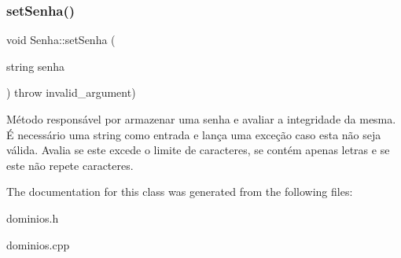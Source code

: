 \subsubsection{\texorpdfstring{set\+Senha()}{setSenha()}}
{\footnotesize\ttfamily void Senha\+::set\+Senha (\begin{DoxyParamCaption}\item[{string}]{senha }\end{DoxyParamCaption}) throw  invalid\+\_\+argument) }

Método responsável por armazenar uma senha e avaliar a integridade da mesma. É necessário uma string como entrada e lança uma exceção caso esta não seja válida. Avalia se este excede o limite de caracteres, se contém apenas letras e se este não repete caracteres. 

The documentation for this class was generated from the following files\+:\begin{DoxyCompactItemize}
\item 
dominios.\+h\item 
dominios.\+cpp\end{DoxyCompactItemize}
